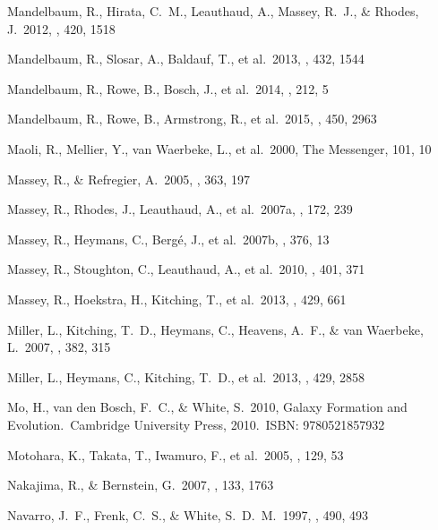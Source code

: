 \documentclass[apj]{emulateapj}
\begin{document}
\begin{thebibliography}{}
  Mandelbaum, R.,
Hirata, C.~M., Leauthaud, A., Massey, R.~J.,
\& Rhodes, J.\ 2012, \mnras, 420, 1518

  Mandelbaum, R.,
  Slosar, A., Baldauf, T., et al.\ 2013, \mnras, 432, 1544

  Mandelbaum, R.,
  Rowe, B., Bosch, J., et al.\ 2014, \apjs, 212, 5

 Mandelbaum, R., 
Rowe, B., Armstrong, R., et al.\ 2015, \mnras, 450, 2963 


  Maoli, R., Mellier, Y.,
  van Waerbeke, L., et al.\ 2000, The Messenger, 101, 10

 Massey, R., \& Refregier, A.\ 2005, \mnras, 363, 197

  Massey, R., Rhodes, J.,
  Leauthaud, A., et al.\ 2007a, \apjs, 172, 239

 Massey, R., Heymans, C.,
Berg{\'e}, J., et al.\ 2007b, \mnras, 376, 13

 Massey, R., Stoughton,
C., Leauthaud, A., et al.\ 2010, \mnras, 401, 371

 Massey, R., Hoekstra,
H., Kitching, T., et al.\ 2013, \mnras, 429, 661

 Miller, L., Kitching,
T.~D., Heymans, C., Heavens, A.~F., \& van Waerbeke, L.\ 2007, \mnras, 382, 315

  Miller, L., Heymans, C.,
  Kitching, T.~D., et al.\ 2013, \mnras, 429, 2858

  Mo, H., van den Bosch, F.~C.,
   \& White, S.\ 2010, Galaxy Formation and Evolution.~Cambridge University
   Press, 2010.~ISBN: 9780521857932

  Motohara, K., Takata,
  T., Iwamuro, F., et al.\ 2005, \aj, 129, 53

   Nakajima, R., \& Bernstein, G.\ 2007, \aj, 133, 1763

  Navarro, J.~F., Frenk,
  C.~S., \& White, S.~D.~M.\ 1997, \apj, 490, 493


\end{thebibliography}
\end{document}
